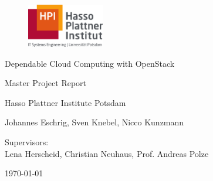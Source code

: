 \begin{titlepage}
  \begin{center} 
    \mbox{}
    \vspace{1cm}
		
		\begin{figure}[h]
			\centering
				\includegraphics[width=0.30\textwidth]{images/HPILogo.pdf}
			\label{fig:hpi_logo}
		\end{figure}
		
		\vspace{1cm}
		
		{\Large Dependable Cloud Computing with OpenStack}\\
	
		\vspace{1cm}
		
		{\Huge Master Project Report}  
		
		\vspace{1cm}
		
		{\Large Hasso Plattner Institute Potsdam}
    
    \vspace{2.5cm}

    \vspace{1em}
    
		{\large Johannes Eschrig, Sven Knebel, Nicco Kunzmann}\\
		
		\vspace{1cm}
		
		Supervisors:\\
		\vspace{1em}
		{\large Lena Herscheid, Christian Neuhaus, Prof. Andreas Polze}\\
		
    \vspace{4em}
    
    \today
  \end{center}
\end{titlepage}